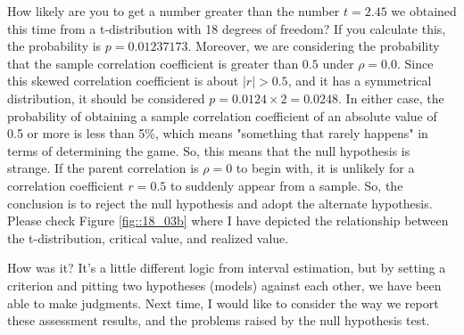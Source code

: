 \documentclass{ltjsbook}
\begin{document}
How likely are you to get a number greater than the number $t=2.45$ we obtained this time from a t-distribution with 18 degrees of freedom? If you calculate this, the probability is $p=0.01237173$. Moreover, we are considering the probability that the sample correlation coefficient is greater than $0.5$ under $\rho=0.0$. Since this skewed correlation coefficient is about $|r|>0.5$, and it has a symmetrical distribution, it should be considered $p=0.0124\times2=0.0248$. In either case, the probability of obtaining a sample correlation coefficient of an absolute value of 0.5 or more is less than 5\%, which means "something that rarely happens" in terms of determining the game. So, this means that the null hypothesis is strange. If the parent correlation is $\rho=0$ to begin with, it is unlikely for a correlation coefficient $r=0.5$ to suddenly appear from a sample. So, the conclusion is to reject the null hypothesis and adopt the alternate hypothesis. Please check Figure \ref{fig::18_03b} where I have depicted the relationship between the t-distribution, critical value, and realized value.





How was it?
It's a little different logic from interval estimation, but by setting a criterion and pitting two hypotheses (models) against each other, we have been able to make judgments.
Next time, I would like to consider the way we report these assessment results, and the problems raised by the null hypothesis test.
\end{document}

